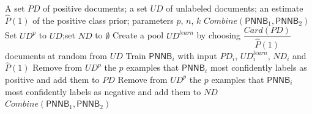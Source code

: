 \documentclass{article}
\begin{document}
\begin{algorithm}[!h]
\renewcommand{\algorithmicrequire}{\textbf{Input:}}
\renewcommand{\algorithmicensure}{\textbf{Output:}}
	\caption{PNCT: co-training from positive and unlabeled documents}
	\begin{algorithmic}[1]
	    \REQUIRE
	    A set $PD$ of positive documents; a set $UD$ of unlabeled documents;
	    an estimate $\hat{P}(1)$ of the positive class prior;
	    parameters $p$, $n$, $k$
	    \ENSURE
	    $Combine(\mathsf{PNNB}_{1},\mathsf{PNNB}_{2})$
	    \STATE Set $UD^{p}$ to $UD$;\quad set $ND$ to $\emptyset$
	    \STATE Create a pool $UD^{learn}$ by choosing
	    $\dfrac{Card(PD)}{\hat{P}(1)}$ documents at random from $UD$ %
	    \STATE Train $\mathsf{PNNB}_{i}$ with input $PD_{i}$, $UD_{i}^{learn}$, $ND_{i}$
	    and $\hat{P}(1)$ %
	    \STATE Remove from $UD^{p}$ the $p$ examples that $\mathsf{PNNB}_{i}$ most confidently
	    labels as positive and add them to $PD$
	    \STATE Remove from $UD^{p}$ the $p$ examples that $\mathsf{PNNB}_{i}$ most confidently
	    labels as negative and add them to $ND$ %
	    \ENDFOR
	    \ENDFOR
		\RETURN $Combine(\mathsf{PNNB}_{1},\mathsf{PNNB}_{2})$
	\end{algorithmic}
\end{algorithm}
\end{document}
